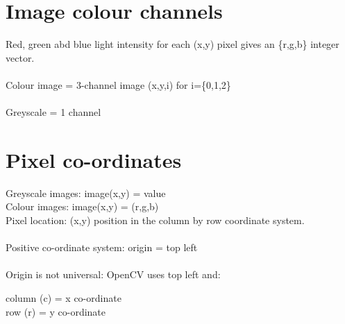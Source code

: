 \documentclass{article}[18pt]
\begin{document}
\section{Image colour channels}
Red, green abd blue light intensity for each (x,y) pixel gives an \{r,g,b\} integer vector.\\
\\
Colour image = 3-channel image (x,y,i) for i=\{0,1,2\}\\
\\
Greyscale = 1 channel
\section{Pixel co-ordinates}
Greyscale images: image(x,y) = value\\
Colour images: image(x,y) = (r,g,b)\\
Pixel location: (x,y) position in the column by row coordinate system.\\
\\
Positive co-ordinate system: origin = top left\\
\\
Origin is not universal: OpenCV uses top left and:
\begin{center}
	column (c) = x co-ordinate\\
	row (r) = y co-ordinate
\end{center}
\end{document}
